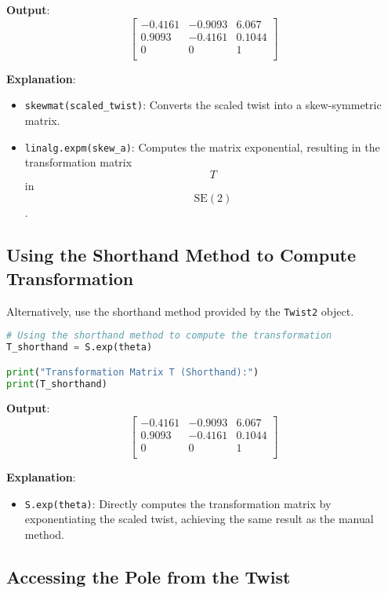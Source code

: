 \documentclass[12pt]{article}
\begin{document}
\textbf{Output}:
$$
\begin{bmatrix}
 -0.4161 & -0.9093 & 6.067 \\
  0.9093 & -0.4161 & 0.1044 \\
  0 & 0 & 1 \\
\end{bmatrix}
$$

\textbf{Explanation}:
\begin{itemize}
    \item \texttt{skewmat(scaled\_twist)}: Converts the scaled twist into a skew-symmetric matrix.
    \item \texttt{linalg.expm(skew\_a)}: Computes the matrix exponential, resulting in the transformation matrix $$ T $$ in $$\text{SE}(2)$$.
\end{itemize}

\subsection{Using the Shorthand Method to Compute Transformation}

Alternatively, use the shorthand method provided by the \texttt{Twist2} object.

\begin{lstlisting}[language=Python]
# Using the shorthand method to compute the transformation
T_shorthand = S.exp(theta)

print("Transformation Matrix T (Shorthand):")
print(T_shorthand)
\end{lstlisting}

\textbf{Output}:
$$
\begin{bmatrix}
 -0.4161 & -0.9093 & 6.067 \\
  0.9093 & -0.4161 & 0.1044 \\
  0 & 0 & 1 \\
\end{bmatrix}
$$

\textbf{Explanation}:
\begin{itemize}
    \item \texttt{S.exp(theta)}: Directly computes the transformation matrix by exponentiating the scaled twist, achieving the same result as the manual method.
\end{itemize}

\subsection{Accessing the Pole from the Twist}
\end{document}
